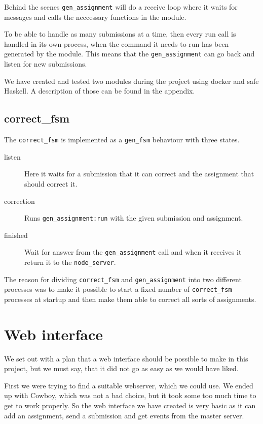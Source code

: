 Behind the scenes \texttt{gen\_assignment} will do a receive loop where it waits
for messages and calls the neccessary functions in the module.

To be able to handle as many submissions at a time, then every run call is
handled in its own process, when the command it needs to run has been generated
by the module. This means that the \texttt{gen\_assignment} can go back and
listen for new submissions.

We have created and tested two modules during the project using docker and safe
Haskell. A description of those can be found in the appendix.

\subsection{correct\_fsm}
The \texttt{correct\_fsm} is implemented as a \texttt{gen\_fsm} behaviour with
three states.
\begin{description}
    \item[listen] Here it waits for a submission that it can correct and the
    assignment that should correct it.
    \item[correction] Runs \texttt{gen\_assignment:run} with the given
    submission and assignment.
    \item[finished] Wait for answer from the \texttt{gen\_assignment} call and
    when it receives it return it to the \texttt{node\_server}.
\end{description}

The reason for dividing \texttt{correct\_fsm} and \texttt{gen\_assignment} into
two different processes was to make it possible to start a fixed number of
\texttt{correct\_fsm} processes at startup and then make them able to correct
all sorts of assignments.

\section{Web interface}
We set out with a plan that a web interface should be possible to make in this
project, but we must say, that it did not go as easy as we would have liked.

First we were trying to find a suitable webserver, which we could use. We ended
up with Cowboy, which was not a bad choice, but it took some too much time to
get to work properly. So the web interface we have created is very basic as it
can add an assignment, send a submission and get events from the master server.

